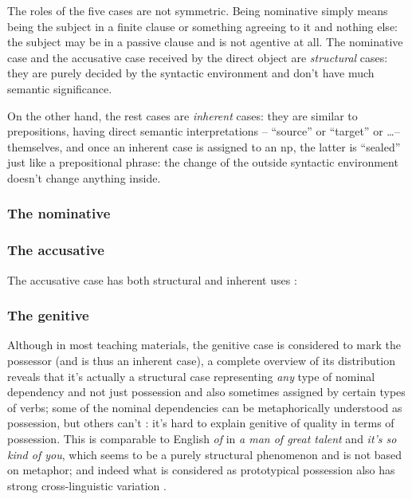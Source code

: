 \documentclass[a4paper, oneside, 12pt]{report}
\newcommand*{\citepage}[1]{p.~{#1}}
\newcommand*{\citepages}[1]{pp.~{#1}}
\newcommand{\form}[1]{\emph{#1}}
\begin{document}
The roles of the five cases are not symmetric.
Being nominative simply means being the subject in a finite clause or something agreeing to it 
and nothing else: 
the subject may be in a passive clause and is not agentive at all.
The nominative case and the accusative case received by the direct object 
are \emph{structural} cases: 
they are purely decided by the syntactic environment 
and don't have much semantic significance.

On the other hand, the rest cases are \emph{inherent} cases:
they are similar to prepositions, having direct semantic interpretations
-- ``source'' or ``target'' or \dots -- themselves,
and once an inherent case is assigned to an \acs{np},
the latter is ``sealed'' just like a prepositional phrase:
the change of the outside syntactic environment 
doesn't change anything inside.

\subsubsection{The nominative}

\subsubsection{The accusative}\label{sec:accusative-distribution}

The accusative case has both structural and inherent uses
\citep[\citepage{238}]{oniga2014latin}: 

\subsubsection{The genitive}\label{sec:genitive-distribution}

Although in most teaching materials, the genitive case is considered 
to mark the possessor (and is thus an inherent case), 
a complete overview of its distribution reveals that 
it's actually a structural case 
representing \emph{any} type of nominal dependency 
and not just possession 
and also sometimes assigned by certain types of verbs;
some of the nominal dependencies can be 
metaphorically understood as possession, 
but others can't \citep[\citepage{244}]{oniga2014latin}:
it's hard to explain genitive of quality 
in terms of possession.
This is comparable to English \form{of}
in \form{a man of great talent} and \form{it's so kind of you},
which seems to be a purely structural phenomenon
and is not based on metaphor;
and indeed what is considered as prototypical possession 
also has strong cross-linguistic variation 
\citep[\citepages{262-263}]{dixon2010basic2}.
\end{document}
